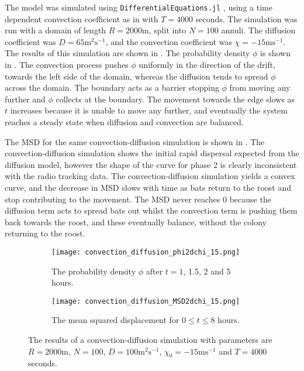 The model was simulated using \texttt{DifferentialEquations.jl} \cite{DifferentialEquations}, using a time dependent convection coefficient as in  with $T = 4000$ seconds. The
simulation was run with a domain of length $R = 2000$m, split into $N = 100$
annuli. The diffusion coefficient was $D = 65\mathrm{m^2s^{-1}}$, and the convection coefficient
was $\chi =  - 15\mathrm{ms^{-1}}$. The results
of this simulation are shown in . The probability density $\phi$ is shown in . The convection process pushes $\phi$ uniformly in the direction of the drift, towards the left side of the domain, whereas the diffusion tends to spread $\phi$ across the domain. The boundary acts as a barrier stopping $\phi$ from moving any further and $\phi$ collects at the boundary. The movement towards the edge slows as $t$ increases because it is unable to move any further, and eventually the system reaches a steady state when diffusion and convection are balanced.

The MSD for the same convection-diffusion simulation is shown in . The convection-diffusion simulation shows the initial rapid dispersal expected from the diffusion model, however the shape of the curve for phase 2 is clearly inconsistent with the radio tracking data. The convection-diffusion simulation yields a convex curve, and the decrease in MSD slows with time as bats return to the roost and stop contributing to the movement. The MSD never reaches 0 because the diffusion term acts to spread bats out whilst the convection term is pushing them back towards the roost, and these eventually balance, without the colony returning to the roost.

\begin{figure}
     \centering
     \begin{subfigure}[b]{0.48\textwidth}
         \centering
         \texttt{[image: convection\_diffusion\_phi2dchi\_15.png]}
         \caption{The probability density $\phi$ after $t = 1$, 1.5, 2 and 5 hours.}
         \label{fig:convection2dphi}
     \end{subfigure}
     \hfill
     \begin{subfigure}[b]{0.48\textwidth}
         \centering
         \texttt{[image: convection\_diffusion\_MSD2dchi\_15.png]}
         \caption{The mean squared displacement for $0 \leq t \leq 8$ hours. }
         \label{fig:convection2dmsd}
     \end{subfigure}
     \caption{The results of a convection-diffusion simulation with parameters are $R = 2000$m, $N = 100$,
     $D = 100\mathrm{m^2s^{-1}}$, $\chi_0 = - 15\mathrm{ms^{-1}}$ and $T = 4000$ seconds.}
     \label{fig:convection2d}
     \end{figure}

